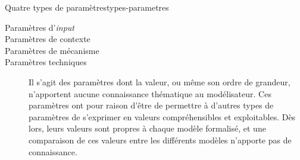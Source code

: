 \begin{encadre}{Quatre types de paramètres}{types-parametres}

	\begin{description}
		\item[Paramètres d'\textit{input}]
		
		\item[Paramètres de contexte]
		
		\item[Paramètres de mécanisme]
		
		\item[Paramètres techniques] Il s'agit des paramètres dont la valeur, ou même son ordre de grandeur, n'apportent aucune connaissance thématique au modélisateur.
		Ces paramètres ont pour raison d'être de permettre à d'autres types de paramètres de s'exprimer en valeurs compréhensibles et exploitables.
		Dès lors, leurs valeurs sont propres à chaque modèle formalisé, et une comparaison de ces valeurs entre les différents modèles n'apporte pas de connaissance.
%		
		

\end{description}
\end{encadre}

